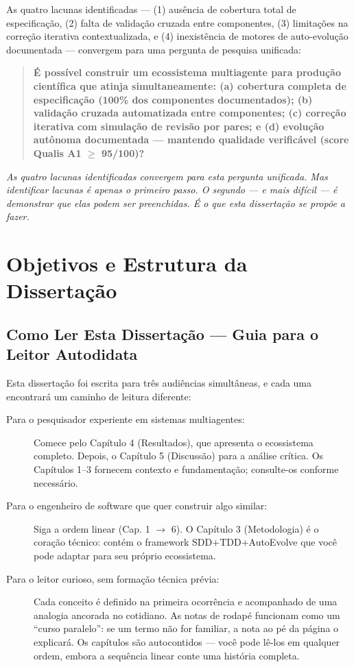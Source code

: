 As quatro lacunas identificadas --- (1) ausência de cobertura total de especificação, (2) falta de validação cruzada entre componentes, (3) limitações na correção iterativa contextualizada, e (4) inexistência de motores de auto-evolução documentada --- convergem para uma pergunta de pesquisa unificada:

\begin{quote}
  \textbf{É possível construir um ecossistema multiagente para produção científica que atinja simultaneamente: (a) cobertura completa de especificação (100\% dos componentes documentados); (b) validação cruzada automatizada entre componentes; (c) correção iterativa com simulação de revisão por pares; e (d) evolução autônoma documentada --- mantendo qualidade verificável (score Qualis A1 $\geq$ 95/100)?}
\end{quote}

\vspace{0.3cm}
{\small\itshape As quatro lacunas identificadas convergem para esta pergunta unificada. Mas identificar lacunas é apenas o primeiro passo. O segundo --- e mais difícil --- é demonstrar que elas podem ser preenchidas. É o que esta dissertação se propõe a fazer.}


\section{Objetivos e Estrutura da Dissertação}

\subsection{Como Ler Esta Dissertação — Guia para o Leitor Autodidata}

Esta dissertação foi escrita para três audiências simultâneas, e cada uma encontrará um caminho de leitura diferente:

\begin{description}
  \item[Para o pesquisador experiente em sistemas multiagentes:] Comece pelo Capítulo 4 (Resultados), que apresenta o ecossistema completo. Depois, o Capítulo 5 (Discussão) para a análise crítica. Os Capítulos 1--3 fornecem contexto e fundamentação; consulte-os conforme necessário.
  \item[Para o engenheiro de software que quer construir algo similar:] Siga a ordem linear (Cap. 1 $\rightarrow$ 6). O Capítulo 3 (Metodologia) é o coração técnico: contém o framework SDD+TDD+AutoEvolve que você pode adaptar para seu próprio ecossistema.
  \item[Para o leitor curioso, sem formação técnica prévia:] Cada conceito é definido na primeira ocorrência e acompanhado de uma analogia ancorada no cotidiano. As notas de rodapé funcionam como um ``curso paralelo'': se um termo não for familiar, a nota ao pé da página o explicará. Os capítulos são autocontidos — você pode lê-los em qualquer ordem, embora a sequência linear conte uma história completa.
\end{description}

